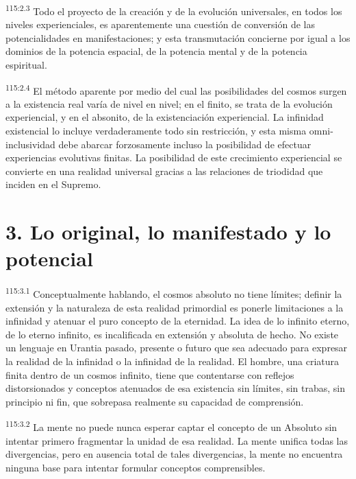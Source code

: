 \par
\textsuperscript{115:2.3} Todo el proyecto de la creación y de la evolución universales, en todos los niveles experienciales, es aparentemente una cuestión de conversión de las potencialidades en manifestaciones; y esta transmutación concierne por igual a los dominios de la potencia espacial, de la potencia mental y de la potencia espiritual.

\par
\textsuperscript{115:2.4} El método aparente por medio del cual las posibilidades del cosmos surgen a la existencia real varía de nivel en nivel; en el finito, se trata de la evolución experiencial, y en el absonito, de la existenciación experiencial. La infinidad existencial lo incluye verdaderamente todo sin restricción, y esta misma omni-inclusividad debe abarcar forzosamente incluso la posibilidad de efectuar experiencias evolutivas finitas. La posibilidad de este crecimiento experiencial se convierte en una realidad universal gracias a las relaciones de triodidad que inciden en el Supremo.

\section*{3. Lo original, lo manifestado y lo potencial}
\par
\textsuperscript{115:3.1} Conceptualmente hablando, el cosmos absoluto no tiene límites; definir la extensión y la naturaleza de esta realidad primordial es ponerle limitaciones a la infinidad y atenuar el puro concepto de la eternidad. La idea de lo infinito eterno, de lo eterno infinito, es incalificada en extensión y absoluta de hecho. No existe un lenguaje en Urantia pasado, presente o futuro que sea adecuado para expresar la realidad de la infinidad o la infinidad de la realidad. El hombre, una criatura finita dentro de un cosmos infinito, tiene que contentarse con reflejos distorsionados y conceptos atenuados de esa existencia sin límites, sin trabas, sin principio ni fin, que sobrepasa realmente su capacidad de comprensión.

\par
\textsuperscript{115:3.2} La mente no puede nunca esperar captar el concepto de un Absoluto sin intentar primero fragmentar la unidad de esa realidad. La mente unifica todas las divergencias, pero en ausencia total de tales divergencias, la mente no encuentra ninguna base para intentar formular conceptos comprensibles.


